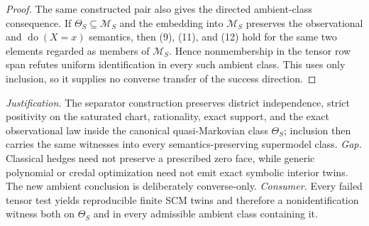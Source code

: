 \documentclass{article}
\begin{document}
\begin{proof}
The same constructed pair also gives the directed ambient-class consequence.  If \(\Theta_S\subseteq\mathcal M_S\) and the embedding into \(\mathcal M_S\) preserves the observational and \(\operatorname{do}(X=x)\) semantics, then (9), (11), and (12) hold for the same two elements regarded as members of \(\mathcal M_S\).  Hence nonmembership in the tensor row span refutes uniform identification in every such ambient class.  This uses only inclusion, so it supplies no converse transfer of the success direction.
\end{proof}
\par\smallskip\noindent \textit{Justification.} The separator construction preserves district independence, strict positivity on the saturated chart, rationality, exact support, and the exact observational law inside the canonical quasi-Markovian class \(\Theta_S\); inclusion then carries the same witnesses into every semantics-preserving supermodel class. \textit{Gap.} Classical hedges need not preserve a prescribed zero face, while generic polynomial or credal optimization need not emit exact symbolic interior twins. The new ambient conclusion is deliberately converse-only. \textit{Consumer.} Every failed tensor test yields reproducible finite SCM twins and therefore a nonidentification witness both on \(\Theta_S\) and in every admissible ambient class containing it.
\end{document}
